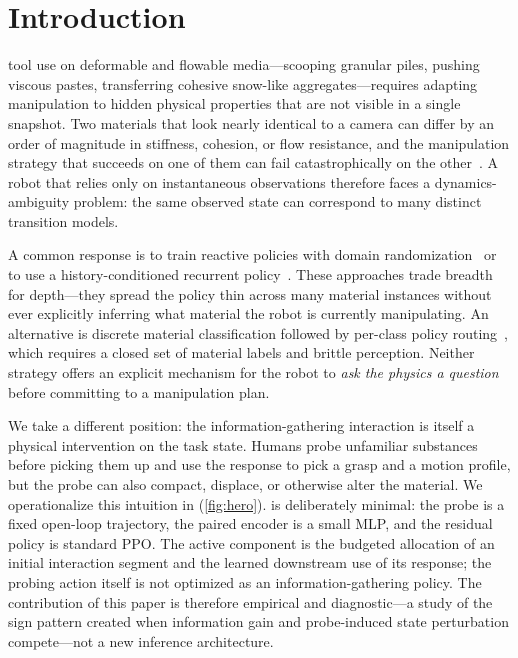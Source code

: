 \section{Introduction}
\label{sec:introduction}

 tool use on deformable and flowable media---scooping granular piles, pushing viscous pastes, transferring cohesive snow-like aggregates---requires adapting manipulation to hidden physical properties that are not visible in a single snapshot. Two materials that look nearly identical to a camera can differ by an order of magnitude in stiffness, cohesion, or flow resistance, and the manipulation strategy that succeeds on one of them can fail catastrophically on the other~\cite{huang2022plasticinelab,lin2022diffskill,shi2023robocook}. A robot that relies only on instantaneous observations therefore faces a dynamics-ambiguity problem: the same observed state can correspond to many distinct transition models.

A common response is to train reactive policies with domain randomization~\cite{tobin2017domain,peng2018sim2real} or to use a history-conditioned recurrent policy~\cite{hausman2018learning,xie2018learning}. These approaches trade breadth for depth---they spread the policy thin across many material instances without ever explicitly inferring what material the robot is currently manipulating. An alternative is discrete material classification followed by per-class policy routing~\cite{calandra2018more}, which requires a closed set of material labels and brittle perception. Neither strategy offers an explicit mechanism for the robot to \emph{ask the physics a question} before committing to a manipulation plan.

We take a different position: the information-gathering interaction is itself a physical intervention on the task state. Humans probe unfamiliar substances before picking them up and use the response to pick a grasp and a motion profile, but the probe can also compact, displace, or otherwise alter the material. We operationalize this intuition in \PTA{} (\cref{fig:hero}). \PTA{} is deliberately minimal: the probe is a fixed open-loop trajectory, the paired encoder is a small MLP, and the residual policy is standard PPO. The active component is the budgeted allocation of an initial interaction segment and the learned downstream use of its response; the probing action itself is not optimized as an information-gathering policy. The contribution of this paper is therefore empirical and diagnostic---a study of the sign pattern created when information gain and probe-induced state perturbation compete---not a new inference architecture.

